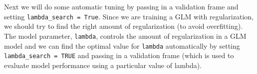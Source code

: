 \documentclass[]{book}
\newenvironment{Shaded}{\begin{snugshade}}{\end{snugshade}}
\newcommand{\CommentTok}[1]{\textcolor[rgb]{0.56,0.35,0.01}{\textit{#1}}}
\newcommand{\DataTypeTok}[1]{\textcolor[rgb]{0.13,0.29,0.53}{#1}}
\newcommand{\DecValTok}[1]{\textcolor[rgb]{0.00,0.00,0.81}{#1}}
\newcommand{\ErrorTok}[1]{\textcolor[rgb]{0.64,0.00,0.00}{\textbf{#1}}}
\newcommand{\KeywordTok}[1]{\textcolor[rgb]{0.13,0.29,0.53}{\textbf{#1}}}
\newcommand{\NormalTok}[1]{#1}
\newcommand{\OperatorTok}[1]{\textcolor[rgb]{0.81,0.36,0.00}{\textbf{#1}}}
\newcommand{\OtherTok}[1]{\textcolor[rgb]{0.56,0.35,0.01}{#1}}
\newcommand{\StringTok}[1]{\textcolor[rgb]{0.31,0.60,0.02}{#1}}
\begin{document}
Next we will do some automatic tuning by passing in a validation frame and setting
\texttt{lambda\_search\ =\ True}. Since we are training a GLM with regularization, we should
try to find the right amount of regularization (to avoid overfitting). The model
parameter, \texttt{lambda}, controls the amount of regularization in a GLM model and we can
find the optimal value for \texttt{lambda} automatically by setting \texttt{lambda\_search\ =\ TRUE}
and passing in a validation frame (which is used to evaluate model performance using a
particular value of lambda).

\begin{Shaded}
\end{Shaded}
\end{document}
